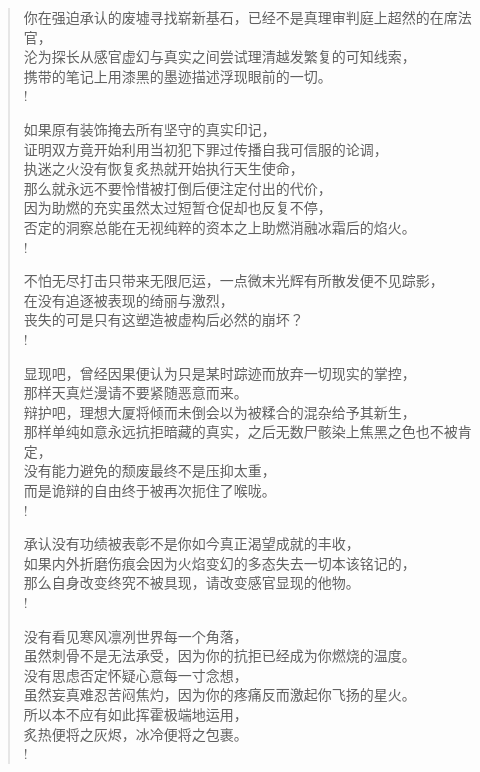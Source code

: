 \documentclass[UTF8, 12pt, a4paper]{ctexrep} %
\begin{document}
\begin{verse}
你在强迫承认的废墟寻找崭新基石，已经不是真理审判庭上超然的在席法官，\\
沦为探长从感官虚幻与真实之间尝试理清越发繁复的可知线索，\\
携带的笔记上用漆黑的墨迹描述浮现眼前的一切。\\!

如果原有装饰掩去所有坚守的真实印记，\\
证明双方竟开始利用当初犯下罪过传播自我可信服的论调，\\
执迷之火没有恢复炙热就开始执行天生使命，\\
那么就永远不要怜惜被打倒后便注定付出的代价，\\
因为助燃的充实虽然太过短暂仓促却也反复不停，\\
否定的洞察总能在无视纯粹的资本之上助燃消融冰霜后的焰火。\\!

不怕无尽打击只带来无限厄运，一点微末光辉有所散发便不见踪影，\\
在没有追逐被表现的绮丽与激烈，\\
丧失的可是只有这塑造被虚构后必然的崩坏？\\!

显现吧，曾经因果便认为只是某时踪迹而放弃一切现实的掌控，\\
那样天真烂漫请不要紧随恶意而来。\\
辩护吧，理想大厦将倾而未倒会以为被糅合的混杂给予其新生，\\
那样单纯如意永远抗拒暗藏的真实，之后无数尸骸染上焦黑之色也不被肯定，\\
没有能力避免的颓废最终不是压抑太重，\\
而是诡辩的自由终于被再次扼住了喉咙。\\!

承认没有功绩被表彰不是你如今真正渴望成就的丰收，\\
如果内外折磨伤痕会因为火焰变幻的多态失去一切本该铭记的，\\
那么自身改变终究不被具现，请改变感官显现的他物。\\!

没有看见寒风凛冽世界每一个角落，\\
虽然刺骨不是无法承受，因为你的抗拒已经成为你燃烧的温度。\\
没有思虑否定怀疑心意每一寸念想，\\
虽然妄真难忍苦闷焦灼，因为你的疼痛反而激起你飞扬的星火。\\
所以本不应有如此挥霍极端地运用，\\
炙热便将之灰烬，冰冷便将之包裹。\\!


\end{verse}
\end{document}

